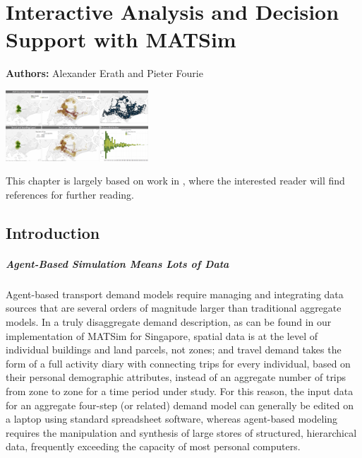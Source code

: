\chapter{Interactive Analysis and Decision Support with MATSim}
\label{ch:businessanalytics}

\hfill \textbf{Authors:} Alexander Erath and Pieter Fourie

\begin{center} \includegraphics[width=0.4\textwidth, angle=0]{extending/figures/businessanalytics/tableau.png} \end{center}


This chapter is largely based on work in \citet[][]{ErathEtAl_EASTS_2013}, where the interested reader will find references for further reading.
\section{Introduction}
\label{sec:analyticsIntro}
\paragraph{Agent-Based Simulation Means Lots of Data}
Agent-based transport demand models require managing and integrating data sources that are several orders of magnitude larger than traditional aggregate models. In a truly disaggregate demand description, as can be found in our implementation of MATSim for Singapore, spatial data is at the level of individual buildings and land parcels, not zones; and travel demand takes the form of a full activity diary with connecting trips for every individual, based on their personal demographic attributes, instead of an aggregate number of trips from zone to zone for a time period under study. For this reason, the input data for an aggregate four-step (or related) demand model can generally be edited on a laptop using standard spreadsheet software, whereas agent-based modeling requires the manipulation and synthesis of large stores of structured, hierarchical data, frequently exceeding the capacity of most personal computers. %

